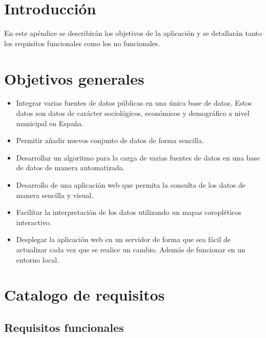 
\section{Introducción}

En este apéndice se describirán los objetivos de la aplicación y se detallarán tanto los requisitos funcionales como los no funcionales.

\section{Objetivos generales}

\begin{itemize}
	\item Integrar varias fuentes de datos públicas en una única base de datos. Estos datos son datos de carácter sociológicos, económicos y demográfico a nivel municipal en España.
	\item Permitir añadir nuevos conjunto de datos de forma sencilla.
	\item Desarrollar un algoritmo para la carga de varias fuentes de datos en una base de datos de manera automatizada.
	\item Desarrollo de una aplicación web que permita la consulta de los datos de manera sencilla y visual.
	\item Facilitar la interpretación de los datos utilizando un mapas coropléticos interactivo.
	\item Desplegar la aplicación web en un servidor de forma que sea fácil de actualizar cada vez que se realice un cambio. Además de funcionar en un entorno local.
\end{itemize}

\section{Catalogo de requisitos}

\subsection{Requisitos funcionales}

